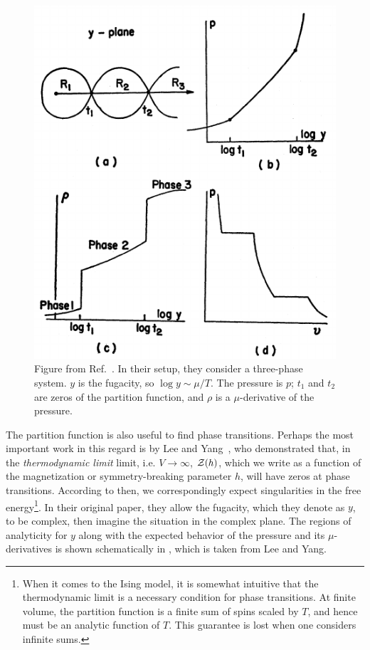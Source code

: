 \begin{figure} 
\centering
\includegraphics[width=0.5\linewidth]{figs/lee_yang.pdf}
\caption{
Figure from Ref.~\cite{yang_statistical_1952}. In their setup, they consider a
three-phase system. $y$ is the fugacity, so $\log y\sim \mu/T$. The pressure is
$p$; $t_1$ and $t_2$ are zeros of the partition function, and $\rho$ is a
$\mu$-derivative of the pressure.
}
\label{fig:leeYangTheorem}
\end{figure}


The partition function is also useful to find
phase transitions. Perhaps the most important work in this regard is by Lee and
Yang~\cite{yang_statistical_1952}, who demonstrated that, in the 
{\it thermodynamic limit} limit, i.e.
$V\to\infty$, $\mathcal{Z}(h)$, which we write as a function of the magnetization or
symmetry-breaking parameter $h$, will have zeros at phase transitions. According
to  then, we correspondingly expect 
singularities in the free energy\footnote{When it comes to the Ising model,
it is somewhat intuitive that the thermodynamic limit is a necessary
condition for phase transitions. At finite volume, the partition function
is a finite sum of spins scaled by $T$, and hence must be an analytic
function of $T$. This guarantee is lost when one considers infinite sums.}. 
In their original paper, they allow the fugacity, which they denote
as $y$, to be complex, then imagine the situation in the complex plane.
The regions of analyticity for $y$ along with the expected behavior
of the pressure and its $\mu$-derivatives is shown schematically
in , which is taken from Lee and Yang. 



